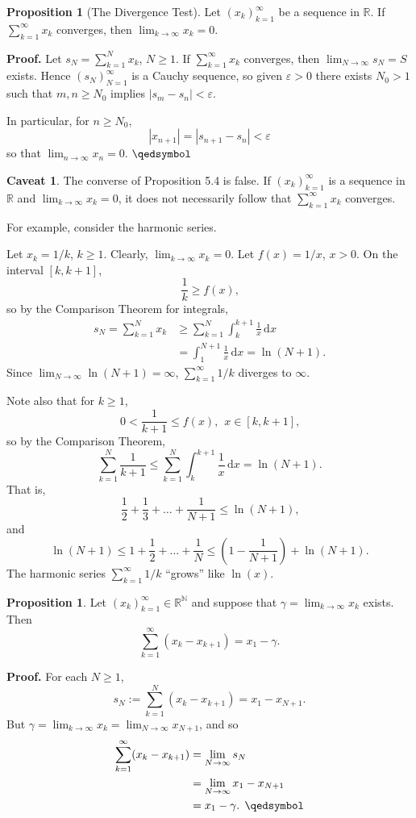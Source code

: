 \documentclass[11pt]{article}
\theoremstyle{definition}
\newtheorem{prop}[thm]{Proposition}
\newtheorem{caveat}[thm]{Caveat}
\newcommand{\mbN}{\ensuremath{\mathbb{N}}}
\newcommand{\mbR}{\ensuremath{\mathbb{R}}}
\begin{document}
\begin{prop}[The Divergence Test]
Let $(x_k)_{k=1}^\infty$ be a sequence in $\mbR$. If $\sum_{k=1}^\infty x_k$ converges, then $\lim_{k\to\infty} x_k = 0$.
\end{prop}
\textbf{Proof.} 
Let $s_N = \sum_{k=1}^N x_k$, $N \geq 1$. If $\sum_{k=1}^\infty x_k$ converges, then $\lim_{N\to\infty} s_N = S$ exists. Hence $(s_N)_{N=1}^\infty$ is a Cauchy sequence, so given $\varepsilon > 0$ there exists $N_0 > 1$ such that $m, n \geq N_0$ implies $|s_m - s_n| < \varepsilon$. 

In particular, for $n \geq N_0$, 
$$|x_{n+1}| = |s_{n+1} - s_n| < \varepsilon$$
so that $\lim_{n\to\infty} x_n = 0$. $\qedsymbol$

\begin{caveat} 
The converse of Proposition 5.4 is false. If $(x_k)_{k=1}^\infty$ is a sequence in $\mbR$ and $\lim_{k\to\infty} x_k = 0$, it does not necessarily follow that $\sum_{k=1}^\infty x_k$ converges. 

For example, consider the harmonic series. 

Let $x_k = 1/k$, $k \geq 1$. Clearly, $\lim_{k\to\infty} x_k = 0$. Let $f(x) = 1/x$, $x > 0$. On the interval $[k, k+1]$, 
$$\frac1k \geq f(x) \text{,}$$
so by the Comparison Theorem for integrals,
\begin{align*}
s_N = \sum_{k=1}^N x_k & \geq \sum_{k=1}^N \int_k^{k+1} \frac1x \, \mathrm{d}x \\
& = \int_1^{N+1} \frac1x \, \mathrm{d}x = \ln(N+1) \text{.}
\end{align*}
Since $\lim_{N\to\infty} \ln(N+1) = \infty$, $\sum_{k=1}^\infty 1/k$ diverges to $\infty$. 

Note also that for $k \geq 1$, 
$$0 < \frac{1}{k+1} \leq f(x), \hspace{5pt} x \in [k, k+1] \text{,}$$
so by the Comparison Theorem,
$$\sum_{k=1}^N \frac{1}{k+1} \leq \sum_{k=1}^N \int_k^{k+1} \frac1x \, \mathrm{d}x = \ln(N+1) \text{.}$$
That is,
$$\frac12 + \frac13 + \dots + \frac1{N+1} \leq \ln(N+1) \text{,}$$
and
$$\ln(N+1) \leq 1 + \frac12 + \dots + \frac1N \leq \left(1 - \frac{1}{N+1}\right) + \ln(N+1) \text{.}$$
The harmonic series $\sum_{k=1}^\infty 1/k$ ``grows'' like $\ln(x)$.
\end{caveat}

\begin{prop}
Let $(x_k)_{k=1}^\infty \in \mbR^{\mbN}$ and suppose that $\gamma = \lim_{k\to\infty} x_k$ exists. Then
$$\sum_{k=1}^\infty (x_k - x_{k+1}) = x_1 - \gamma \text{.}$$
\end{prop}
\textbf{Proof.}
For each $N \geq 1$,
$$s_N := \sum_{k=1}^N (x_k - x_{k+1}) = x_1 - x_{N+1} \text{.}$$
But $\gamma = \lim_{k\to\infty} x_k = \lim_{N\to\infty} x_{N+1}$, and so
\begin{align*}
\sum_{k=1}^\infty (x_k - x_{k+1}) & = \lim_{N\to\infty} s_N \\
& = \lim_{N\to\infty} x_1 - x_{N+1} \\
& = x_1 - \gamma \text{. } \qedsymbol
\end{align*}
\end{document}
